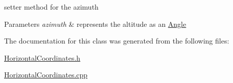 setter method for the azimuth 


\begin{DoxyParams}{Parameters}
{\em azimuth} & represents the altitude as an \mbox{\hyperlink{classAngle}{Angle}} \\
\hline
\end{DoxyParams}


The documentation for this class was generated from the following files\+:\begin{DoxyCompactItemize}
\item 
\mbox{\hyperlink{HorizontalCoordinates_8h}{Horizontal\+Coordinates.\+h}}\item 
\mbox{\hyperlink{HorizontalCoordinates_8cpp}{Horizontal\+Coordinates.\+cpp}}\end{DoxyCompactItemize}
